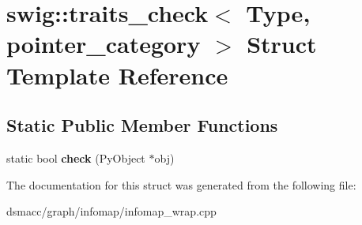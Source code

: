 \hypertarget{structswig_1_1traits__check_3_01Type_00_01pointer__category_01_4}{}\section{swig\+:\+:traits\+\_\+check$<$ Type, pointer\+\_\+category $>$ Struct Template Reference}
\label{structswig_1_1traits__check_3_01Type_00_01pointer__category_01_4}
\subsection*{Static Public Member Functions}
\begin{DoxyCompactItemize}
\item 
\mbox{\label{structswig_1_1traits__check_3_01Type_00_01pointer__category_01_4_ae3cc14b7411d171e1cf97aabd9ff92c5}} 
static bool {\bfseries check} (Py\+Object $\ast$obj)
\end{DoxyCompactItemize}


The documentation for this struct was generated from the following file\+:\begin{DoxyCompactItemize}
\item 
dsmacc/graph/infomap/infomap\+\_\+wrap.\+cpp\end{DoxyCompactItemize}
